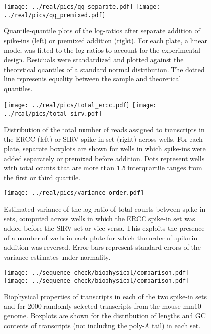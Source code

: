 \documentclass{article}
\begin{document}
\begin{figure}[btp]
    \begin{center}
        \texttt{[image: ../real/pics/qq\_separate.pdf]}
        \texttt{[image: ../real/pics/qq\_premixed.pdf]}
    \end{center}
    \caption{Quantile-quantile plots of the log-ratios after separate addition of spike-ins (left) or premixed addition (right).
        For each plate, a linear model was fitted to the log-ratios to account for the experimental design.
        Residuals were standardized and plotted against the theoretical quantiles of a standard normal distribution.
        The dotted line represents equality between the sample and theoretical quantiles.
    }
\end{figure}

\begin{figure}[btp]
    \begin{center}
        \texttt{[image: ../real/pics/total\_ercc.pdf]}
        \texttt{[image: ../real/pics/total\_sirv.pdf]}
    \end{center}
    \caption{Distribution of the total number of reads assigned to transcripts in the ERCC (left) or SIRV spike-in set (right) across wells.
        For each plate, separate boxplots are shown for wells in which spike-ins were added separately or premixed before addition.
        Dots represent wells with total counts that are more than 1.5 interquartile ranges from the first or third quartile.
    }
\end{figure}

\begin{figure}[btp]
    \begin{center}
        \texttt{[image: ../real/pics/variance\_order.pdf]}
    \end{center}
    \caption{Estimated variance of the log-ratio of total counts between spike-in sets, computed across wells in which the ERCC spike-in set was added before the SIRV set or vice versa.
        This exploits the presence of a number of wells in each plate for which the order of spike-in addition was reversed.
        Error bars represent standard errors of the variance estimates under normality.
    }
\end{figure}

\begin{figure}[btp]
    \begin{center}
        \texttt{[image: ../sequence\_check/biophysical/comparison.pdf]}
        \texttt{[image: ../sequence\_check/biophysical/comparison.pdf]}
    \end{center}
    \caption{Biophysical properties of transcripts in each of the two spike-in sets and for 2000 randomly selected transcripts from the mouse mm10 genome.
    Boxplots are shown for the distribution of lengths and GC contents of transcripts (not including the poly-A tail) in each set.
}
\end{figure}
\end{document}
